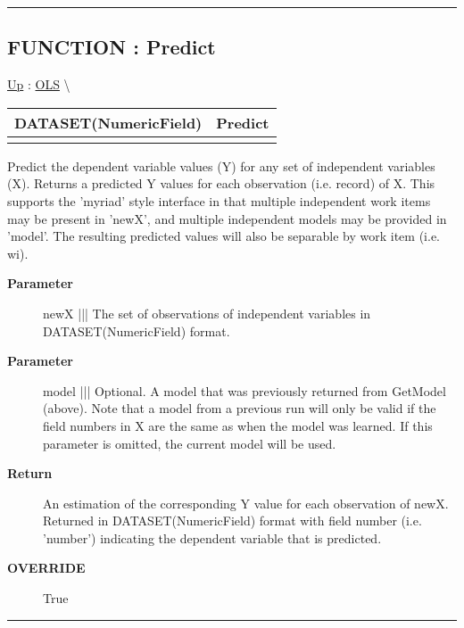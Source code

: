 \rule{\linewidth}{0.5pt}
\subsection*{FUNCTION : Predict}
\hypertarget{ecldoc:linearregression.ols.predict}{}
\hyperlink{ecldoc:linearregression.ols}{Up} :
\hspace{0pt} \hyperlink{ecldoc:linearregression.ols}{OLS} \textbackslash 

{\renewcommand{\arraystretch}{1.5}
\begin{tabularx}{\textwidth}{|>{\raggedright\arraybackslash}l|X|}
\hline
\hspace{0pt}DATASET(NumericField) & Predict \\
\hline
\multicolumn{2}{|>{\raggedright\arraybackslash}X|}{\hspace{0pt}(DATASET(NumericField) newX, DATASET(Layout\_Model) model=GetModel)} \\
\hline
\end{tabularx}
}

\par
Predict the dependent variable values (Y) for any set of independent variables (X). Returns a predicted Y values for each observation (i.e. record) of X. This supports the 'myriad' style interface in that multiple independent work items may be present in 'newX', and multiple independent models may be provided in 'model'. The resulting predicted values will also be separable by work item (i.e. wi).

\par
\begin{description}
\item [\textbf{Parameter}] newX ||| The set of observations of independent variables in DATASET(NumericField) format.
\item [\textbf{Parameter}] model ||| Optional. A model that was previously returned from GetModel (above). Note that a model from a previous run will only be valid if the field numbers in X are the same as when the model was learned. If this parameter is omitted, the current model will be used.
\item [\textbf{Return}] An estimation of the corresponding Y value for each observation of newX. Returned in DATASET(NumericField) format with field number (i.e. 'number') indicating the dependent variable that is predicted.
\item [\textbf{OVERRIDE}] True
\end{description}

\rule{\linewidth}{0.5pt}
